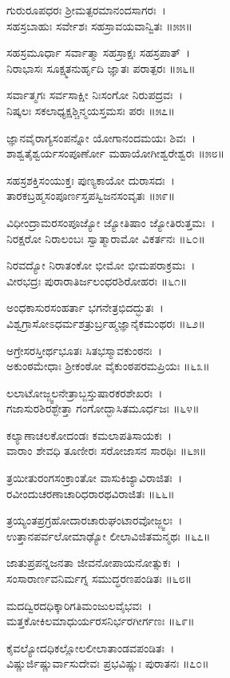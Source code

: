 	ಗುರುರೂಪಧರಃ ಶ್ರೀಮತ್ಪರಮಾನಂದಸಾಗರಃ~।\\
	ಸಹಸ್ರಬಾಹುಃ ಸರ್ವೇಶಃ ಸಹಸ್ರಾವಯವಾನ್ವಿತಃ ॥೫೫॥

ಸಹಸ್ರಮೂರ್ಧಾ ಸರ್ವಾತ್ಮಾ ಸಹಸ್ರಾಕ್ಷಃ ಸಹಸ್ರಪಾತ್~।\\
ನಿರಾಭಾಸಃ ಸೂಕ್ಷ್ಮತನುರ್ಹೃದಿ ಜ್ಞಾತಃ ಪರಾತ್ಪರಃ ॥೫೬॥

	ಸರ್ವಾತ್ಮಗಃ ಸರ್ವಸಾಕ್ಷೀ ನಿಃಸಂಗೋ ನಿರುಪದ್ರವಃ~।\\
	ನಿಷ್ಕಲಃ ಸಕಲಾಧ್ಯಕ್ಷಶ್ಚಿನ್ಮಯಸ್ತಮಸಃ ಪರಃ ॥೫೭॥

ಜ್ಞಾನವೈರಾಗ್ಯಸಂಪನ್ನೋ ಯೋಗಾನಂದಮಯಃ ಶಿವಃ~।\\
ಶಾಶ್ವತೈಶ್ವರ್ಯಸಂಪೂರ್ಣೋ ಮಹಾಯೋಗೀಶ್ವರೇಶ್ವರಃ ॥೫೮॥

	ಸಹಸ್ರಶಕ್ತಿಸಂಯುಕ್ತಃ ಪುಣ್ಯಕಾಯೋ ದುರಾಸದಃ~।\\
	ತಾರಕಬ್ರಹ್ಮಸಂಪೂರ್ಣಸ್ತಪಸ್ವಿಜನಸಂವೃತಃ ॥೫೯॥

ವಿಧೀಂದ್ರಾಮರಸಂಪೂಜ್ಯೋ ಜ್ಯೋತಿಷಾಂ ಜ್ಯೋತಿರುತ್ತಮಃ~।\\
ನಿರಕ್ಷರೋ ನಿರಾಲಂಬಃ ಸ್ವಾತ್ಮಾರಾಮೋ ವಿಕರ್ತನಃ ॥೬೦॥

	ನಿರವದ್ಯೋ ನಿರಾತಂಕೋ ಭೀಮೋ ಭೀಮಪರಾಕ್ರಮಃ~।\\
	ವೀರಭದ್ರಃ ಪುರಾರಾತಿರ್ಜಲಂಧರಶಿರೋಹರಃ ॥೬೧॥

ಅಂಧಕಾಸುರಸಂಹರ್ತಾ ಭಗನೇತ್ರಭಿದದ್ಭುತಃ~।\\
ವಿಶ್ವಗ್ರಾಸೋಽಧರ್ಮಶತ್ರುರ್ಬ್ರಹ್ಮಜ್ಞಾನೈಕಮಂಥರಃ ॥೬೨॥

	ಅಗ್ರೇಸರಸ್ತೀರ್ಥಭೂತಃ ಸಿತಭಸ್ಮಾವಕುಂಠನಃ~।\\
	ಅಕುಂಠಮೇಧಾಃ ಶ್ರೀಕಂಠೋ ವೈಕುಂಠಪರಮಪ್ರಿಯಃ ॥೬೩॥

ಲಲಾಟೋಜ್ಜ್ವಲನೇತ್ರಾಬ್ಜಸ್ತುಷಾರಕರಶೇಖರಃ~।\\
ಗಜಾಸುರಶಿರಶ್ಛೇತ್ತಾ ಗಂಗೋದ್ಭಾಸಿತಮೂರ್ಧಜಃ ॥೬೪॥

	ಕಲ್ಯಾಣಾಚಲಕೋದಂಡಃ ಕಮಲಾಪತಿಸಾಯಕಃ~।\\
	ವಾರಾಂ ಶೇವಧಿ ತೂಣೀರಃ ಸರೋಜಾಸನ ಸಾರಥಿಃ ॥೬೫॥

ತ್ರಯೀತುರಂಗಸಂಕ್ರಾಂತೋ ವಾಸುಕಿಜ್ಯಾವಿರಾಜಿತಃ~।\\
ರವೀಂದುಚರಣಾಚಾರಿಧರಾರಥವಿರಾಜಿತಃ ॥೬೬॥

	ತ್ರಯ್ಯಂತಪ್ರಗ್ರಹೋದಾರಚಾರುಘಂಟಾರವೋಜ್ಜ್ವಲಃ~।\\
	ಉತ್ತಾನಪರ್ವಲೋಮಾಢ್ಯೋ ಲೀಲಾವಿಜಿತಮನ್ಮಥಃ ॥೬೭॥

ಜಾತುಪ್ರಪನ್ನಜನತಾ ಜೀವನೋಪಾಯನೋತ್ಸುಕಃ~।\\
ಸಂಸಾರಾರ್ಣವನಿರ್ಮಗ್ನ ಸಮುದ್ಧರಣಪಂಡಿತಃ ॥೬೮॥

	ಮದದ್ವಿರದಧಿಕ್ಕಾರಿಗತಿಮಂಜುಲವೈಭವಃ~।\\
	ಮತ್ತಕೋಕಿಲಮಾಧುರ್ಯರಸನಿರ್ಭರಗೀರ್ಗಣಃ ॥೬೯॥

ಕೈವಲ್ಯೋದಧಿಕಲ್ಲೋಲಲೀಲಾತಾಂಡವಪಂಡಿತಃ~।\\
ವಿಷ್ಣುರ್ಜಿಷ್ಣುರ್ವಾಸುದೇವಃ ಪ್ರಭವಿಷ್ಣುಃ ಪುರಾತನಃ ॥೭೦॥

